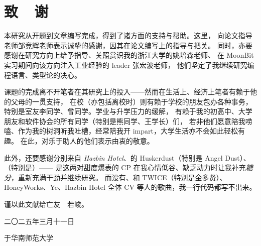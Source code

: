 
\chapter*{致\ \ 谢}
\vspace{0.68cm}

本研究从开题到文章编写完成，得到了诸方面的支持与帮助。这里，
向论文指导老师邹竞辉老师表示诚挚的感谢，因其在论文编写上的指导与把关。
同时，亦要感谢在研究方向上给予指导、关照赏识我的浙江大学的姚培森老师、
在 MoonBit 实习期间向该方向注入工业经验的 leader 张宏波老师，
他们坚定了我继续研究编程语言、类型论的决心。

课题的完成离不开笔者在其研究上的投入——然而在生活上、经济上笔者有赖于他的父母的一贯支持，
在校（亦包括离校时）则有赖于学校的朋友包办各种事务，特别是室友李同学、曾同学。学业与升学压力的缓解，
有赖于我的初高中、大学朋友和软件协会的所有同学（特别是熊同学、王学长）们，
若非他们愿意陪我唠嗑、作为我的树洞听我吐槽，经常陪我开 impart，大学生活亦不会如此轻松有趣。
在此，对乐于助人的他们表示由衷的敬意。

此外，还要感谢分别来自 \emph{Hazbin Hotel}、的 Huskerdust（特别是 Angel Dust）、（特别是）——
是这两对甜度爆表的 CP 在我心情低谷、缺乏动力时让我补充\emph{糖分}，重新充满干劲并继续研究。
而没有、和 TWICE（特别是金多贤）、HoneyWorks、Ye、Hazbin Hotel 全体 CV 等人的歌曲，我一行代码都写不出来。

谨以此文献给亡友\ \ 若峻。
\vspace{0.38cm}

\begin{flushright}
  二〇二五年三月十一日

  于华南师范大学
\end{flushright}